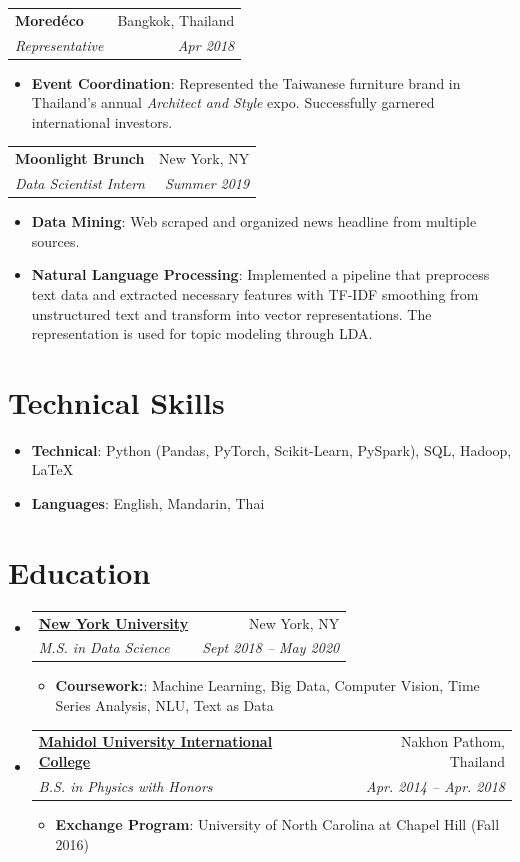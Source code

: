 \documentclass[letterpaper,11pt]{article}
\makeatletter
\newcommand{\resumeItem}[2]{
  \item\small{
    \textbf{#1}{: #2 \vspace{-2pt}}
  }
}
\newcommand{\resumeSubheading}[4]{
  \vspace{-1pt}\item
    \begin{tabular*}{0.97\textwidth}{l@{\extracolsep{\fill}}r}
      \textbf{#1} & #2 \\
      \textit{\small#3} & \textit{\small #4} \\
    \end{tabular*}\vspace{-5pt}
}
\newcommand{\resumeSubHeadingListStart}{\begin{itemize}[leftmargin=*]}
\newcommand{\resumeSubHeadingListEnd}{\end{itemize}}
\newcommand{\resumeItemListStart}{\begin{itemize}}
\newcommand{\resumeItemListEnd}{\end{itemize}\vspace{-1pt}}
\makeatother
\begin{document}
\resumeSubheading{Mored\'{e}co}{Bangkok, Thailand}{Representative}{Apr 2018}
   	\resumeItemListStart
		\resumeItem{Event Coordination}{Represented the Taiwanese furniture brand in Thailand's  annual \textit{Architect and Style} expo. Successfully garnered international investors.}
   	\resumeItemListEnd
   	
\resumeSubheading{Moonlight Brunch}{New York, NY}{Data Scientist Intern}{Summer 2019}
   	\resumeItemListStart
   		\resumeItem{Data Mining}{Web scraped and organized news headline from multiple sources.}
        \resumeItem{Natural Language Processing}{Implemented a pipeline that preprocess text data and extracted necessary features with TF-IDF smoothing from unstructured text and transform into vector representations. The representation is used for topic modeling through LDA.}
\fi

\resumeSubHeadingListEnd

\section{Technical Skills}
 \resumeSubHeadingListStart
   \resumeItem{
     \textbf{Technical}}{Python (\footnotesize{Pandas, PyTorch, Scikit-Learn, PySpark}), SQL, Hadoop, \LaTeX}
\resumeItem{
     \textbf{Languages}}{\normalfont  English, Mandarin, Thai}
 \resumeSubHeadingListEnd
 

\section{Education}
  \resumeSubHeadingListStart
    \resumeSubheading
      {\href{https://cds.nyu.edu/}{\color{Black}New York University}}{New York, NY}
      {M.S. in Data Science}{Sept 2018 -- \textit{May 2020}}
        \resumeItemListStart
            \resumeItem{Coursework:}
                {Machine Learning, Big Data, Computer Vision, Time Series Analysis, NLU,  Text as Data}
        \resumeItemListEnd
    \resumeSubheading
      {\href{https://muic.mahidol.ac.th/eng/programs/undergraduate-programs/science/physics/}{\color{Black} Mahidol University International College}}{Nakhon Pathom, Thailand}
      {B.S. in Physics with Honors}{Apr. 2014 -- Apr. 2018}
      \resumeItemListStart
            \resumeItem{Exchange Program}
                {University of North Carolina at Chapel Hill (Fall 2016)}
        \resumeItemListEnd
  \resumeSubHeadingListEnd
  
%
\end{document}
